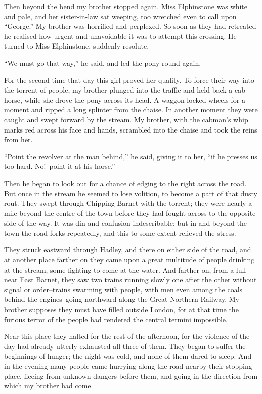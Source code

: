 Then beyond the bend my brother stopped again. Miss Elphinstone was
white and pale, and her sister-in-law sat weeping, too wretched
even to call upon ``George.'' My brother was horrified and perplexed.
So soon as they had retreated he realised how urgent and
unavoidable it was to attempt this crossing. He turned to Miss
Elphinstone, suddenly resolute.

``We must go that way,'' he said, and led the pony round again.

For the second time that day this girl proved her quality. To force
their way into the torrent of people, my brother plunged into the
traffic and held back a cab horse, while she drove the pony across
its head. A waggon locked wheels for a moment and ripped a long
splinter from the chaise. In another moment they were caught and
swept forward by the stream. My brother, with the cabman's whip
marks red across his face and hands, scrambled into the chaise and
took the reins from her.

``Point the revolver at the man behind,'' he said, giving it to her,
``if he presses us too hard. No!--point it at his horse.''

Then he began to look out for a chance of edging to the right
across the road. But once in the stream he seemed to lose volition,
to become a part of that dusty rout. They swept through Chipping
Barnet with the torrent; they were nearly a mile beyond the centre
of the town before they had fought across to the opposite side of
the way. It was din and confusion indescribable; but in and beyond
the town the road forks repeatedly, and this to some extent
relieved the stress.

They struck eastward through Hadley, and there on either side of
the road, and at another place farther on they came upon a great
multitude of people drinking at the stream, some fighting to come
at the water. And farther on, from a lull near East Barnet, they
saw two trains running slowly one after the other without signal or
order--trains swarming with people, with men even among the coals
behind the engines--going northward along the Great Northern
Railway. My brother supposes they must have filled outside London,
for at that time the furious terror of the people had rendered the
central termini impossible.

Near this place they halted for the rest of the afternoon, for the
violence of the day had already utterly exhausted all three of
them. They began to suffer the beginnings of hunger; the night was
cold, and none of them dared to sleep. And in the evening many
people came hurrying along the road nearby their stopping place,
fleeing from unknown dangers before them, and going in the
direction from which my brother had come.

